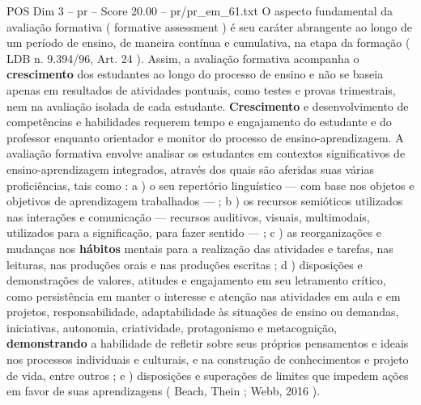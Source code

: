\begin{textsample}{POS Dim 3 – pr – Score 20.00 – pr/pr\_em\_61.txt}
O aspecto fundamental da avaliação formativa ( formative assessment ) é seu caráter abrangente ao longo de um período de ensino, de maneira contínua e cumulativa, na etapa da formação ( LDB n. 9.394/96, Art. 24 ).
Assim, a avaliação formativa acompanha o \textbf{crescimento} dos estudantes ao longo do processo de ensino e não se baseia apenas em resultados de atividades pontuais, como testes e provas trimestrais, nem na avaliação isolada de cada estudante. \textbf{Crescimento} e desenvolvimento de competências e habilidades requerem tempo e engajamento do estudante e do professor enquanto orientador e monitor do processo de ensino-aprendizagem.
A avaliação formativa envolve analisar os estudantes em contextos significativos de ensino-aprendizagem integrados, através dos quais são aferidas suas várias proficiências, tais como : a ) o seu repertório linguístico — com base nos objetos e objetivos de aprendizagem trabalhados — ; b ) os recursos semióticos utilizados nas interações e comunicação — recursos auditivos, visuais, multimodais, utilizados para a significação, para fazer sentido — ; c ) as reorganizações e mudanças nos \textbf{hábitos} mentais para a realização das atividades e tarefas, nas leituras, nas produções orais e nas produções escritas ; d ) disposições e demonstrações de valores, atitudes e engajamento em seu letramento crítico, como persistência em manter o interesse e atenção nas atividades em aula e em projetos, responsabilidade, adaptabilidade às situações de ensino ou demandas, iniciativas, autonomia, criatividade, protagonismo e metacognição, \textbf{demonstrando} a habilidade de refletir sobre seus próprios pensamentos e ideais nos processos individuais e culturais, e na construção de conhecimentos e projeto de vida, entre outros ; e ) disposições e superações de limites que impedem ações em favor de suas aprendizagens ( Beach, Thein ; Webb, 2016 ).

\end{textsample}
